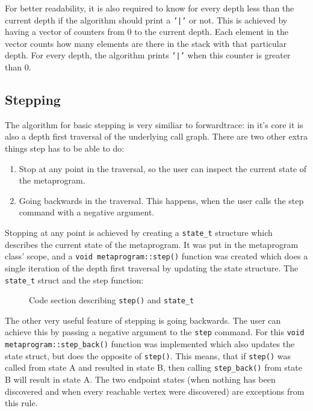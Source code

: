 For better readability, it is also required to know for every depth less than
the current depth if the algorithm should print a \texttt{'|'} or not. This
is achieved by having a vector of counters from 0 to the current depth. Each
element in the vector counts how many elements are there in the stack with that
particular depth. For every depth, the algorithm prints \texttt{'|'} when
this counter is greater than 0.

\subsection{Stepping}

The algorithm for basic stepping is very similiar to forwardtrace: in it's core
it is also a depth first traversal of the underlying call graph. There are two
other extra things step has to be able to do:

\begin{enumerate}
    \item
        Stop at any point in the traversal, so the user can inspect the current
        state of the metaprogram.
    \item
        Going backwards in the traversal. This happens, when the user calls the
        step command with a negative argument.
\end{enumerate}

Stopping at any point is achieved by creating a \texttt{state\_t} structure
which describes the current state of the metaprogram. It was put in the
metaprogram class' scope, and a \texttt{void metaprogram::step()} function
was created which does a single iteration of the depth first traversal by
updating the state structure. The \texttt{state\_t} struct and the step
function:

\begin{figure}[H]
    \caption{Code section describing \texttt{step()} and \texttt{state\_t}}
\end{figure}

\noindent
The other very useful feature of stepping is going backwards. The user can
achieve this by passing a negative argument to the \texttt{step} command. For
this \texttt{void metaprogram::step\_back()} function was implemented which also
updates the state struct, but does the opposite of \texttt{step()}. This
means, that if \texttt{step()} was called from state A and resulted in state
B, then calling \texttt{step\_back()} from state B will result in state A.
The two endpoint states (when nothing has been discovered and when every
reachable vertex were discovered) are exceptions from this rule.

